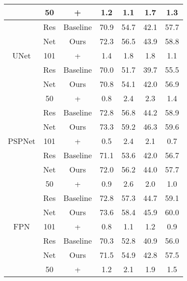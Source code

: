 \begin{table}[h!]
{\begin{tabular}{c|c|c|c|c|c|c}
                            & 50   & +       & 1.2  & 1.1      & 1.7    & 1.3       \\ \hline
                          &Res & Baseline    & 70.9 & 54.7      & 42.1    & 57.7     \\ \cline{3-7} 
                          &Net & Ours   & 72.3 & 56.5     & 43.9   & 58.8      \\ \cline{3-7} 
UNet                      & 101     & +      & 1.4  & 1.8        & 1.8     & 1.1      \\ \cline{2-7} 
 ~\cite{ronneberger2015u} &Res  & Baseline      & 70.0 & 51.7      & 39.7   & 55.5     \\ \cline{3-7} 
                          &Net  & Ours     & 70.8 & 54.1     & 42.0    & 56.9      \\ \cline{3-7} 
                          &50   & +      & 0.8 & 2.4        & 2.3     & 1.4      \\ \hline
                          &Res   & Baseline      & 72.8 & 56.8      & 44.2    & 58.9      \\ \cline{3-7} 
                          &Net  & Ours     & 73.3 & 59.2      & 46.3    & 59.6      \\ \cline{3-7} 
PSPNet                    &101  & +             & 0.5  & 2.4      & 2.1    & 0.7     \\ \cline{2-7} 
 ~\cite{zhao2017pyramid}  &Res  & Baseline      & 71.1 & 53.6      & 42.0    & 56.7      \\ \cline{3-7} 
                          &Net  & Ours     & 72.0 & 56.2      & 44.0    & 57.7     \\ \cline{3-7} 
                          &50   & +             & 0.9 & 2.6       & 2.0      & 1.0      \\ \hline
                          &Res  & Baseline & 72.8 & 57.3      & 44.7    & 59.1     \\ \cline{3-7} 
                          &Net  & Ours     & 73.6 & 58.4      & 45.9   & 60.0     \\ \cline{3-7} 
 FPN                      & 101 & +             & 0.8  & 1.1      & 1.2   & 0.9      \\ \cline{2-7} 
 ~\cite{lin2017feature}   & Res & Baseline      & 70.3 & 52.8      & 40.9    & 56.0      \\ \cline{3-7} 
                          & Net & Ours     & 71.5 & 54.9     & 42.8    & 57.5     \\ \cline{3-7} 
                          & 50  & +             & 1.2  & 2.1      & 1.9    & 1.5      \\ \hline
\end{tabular}
}
\end{table}  


